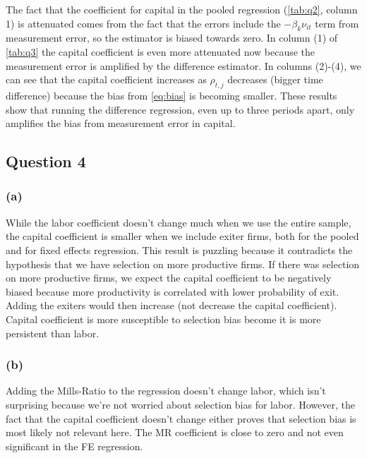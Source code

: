 \documentclass[11pt]{article}
\begin{document}
The fact that the coefficient for capital in the pooled regression (\autoref{tab:q2}, column 1) is attenuated comes from the fact that the errors include the $-\beta_k\nu_{it}$ term from measurement error, so the estimator is biased towards zero. In column (1) of \autoref{tab:q3} the capital coefficient is even more attenuated now because the measurement error is amplified by the difference estimator. In columns (2)-(4), we can see that the capital coefficient increases as $\rho_{t,j}$ decreases (bigger time difference) because the bias from \autoref{eq:bias} is becoming smaller. These results show that running the difference regression, even up to three periods apart, only amplifies the bias from measurement error in capital. 


\subsection*{Question 4} \label{q4}
\subsubsection*{(a)}

While the labor coefficient doesn't change much when we use the entire sample, the capital coefficient is smaller when we include exiter firms, both for the pooled and for fixed effects regression. This result is puzzling because it contradicts the hypothesis that we have selection on more productive firms. If there was selection on more productive firms, we expect the capital coefficient to be negatively biased because more productivity is correlated with lower probability of exit. Adding the exiters would then increase (not decrease the capital coefficient). Capital coefficient is more susceptible to selection bias become it is more persistent than labor. 


\FloatBarrier

\subsubsection*{(b)} Adding the Mills-Ratio to the regression doesn't change labor, which isn't surprising because we're not worried about selection bias for labor. However, the fact that the capital coefficient doesn't change either proves that selection bias is most likely not relevant here. The MR coefficient is close to zero and not even significant in the FE regression. 


\end{document}
